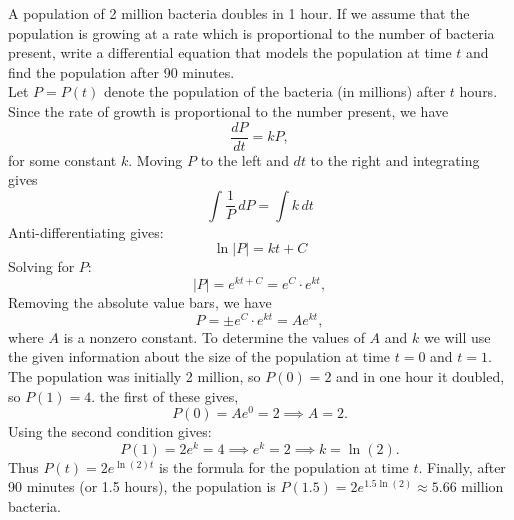 \documentclass{ximera}
\begin{document}
\begin{example}[example 5]
A population of 2 million bacteria doubles in 1 hour. If we assume that the population is growing at a rate which is proportional to the number of bacteria present,
write a differential equation that models the population at time $t$ and find the population after 90 minutes.\\
Let $P = P(t)$ denote the population of the bacteria (in millions) after $t$ hours.
Since the rate of growth is proportional to the number present, we have
\[
\frac{dP}{dt} = k P,
\]
for some constant $k$.
Moving $P$ to the left and $dt$ to the right and integrating gives
\[
\int \frac{1}{P}\, dP = \int k \, dt
\]
Anti-differentiating gives:
\[
\ln|P| = kt + C
\]
Solving for $P$:
\[
|P| = e^{kt+C} = e^C \cdot e^{kt},
\]
Removing the absolute value bars, we have
\[
P = \pm e^C \cdot e^{kt} = Ae^{kt},
\]
where $A$ is a nonzero constant.
To determine the values of $A$ and $k$ we will use the given information about the size of the population at time $t = 0$ and $t = 1$.
The population was initially 2 million, so $P(0) = 2$ and in one hour it doubled, so $P(1) = 4$. the first of these gives,
\[
P(0) = Ae^{0} = 2 \implies A = 2.
\]
Using the second condition gives:
\[
P(1) = 2e^k = 4 \implies e^k = 2 \implies k = \ln(2).
\]
Thus $P(t) = 2e^{\ln(2)t}$ is the formula for the population at time $t$. Finally, after 90 minutes (or 1.5 hours), the population is 
$P(1.5) = 2e^{1.5\ln(2)} \approx 5.66$ million bacteria.

\end{example}
\end{document}
